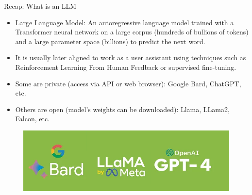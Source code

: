 \documentclass[handout]{beamer}
\begin{document}
\begin{frame}{Recap: What is an LLM}
\begin{scriptsize}
\begin{itemize}
\item  Large Language Model: An autoregressive language model trained with a Transformer neural network on a large corpus (hundreds of bullions of tokens) and a large parameter space (billions) to predict the next word.
\item It is usually later aligned to work as a user assistant using techniques such as Reinforcement Learning From Human Feedback  \cite{ouyang2022training} or supervised fine-tuning.
\item Some are private (access via API or web browser): Google Bard, ChatGPT, etc.
\item Others are open (model's weights can be downloaded): Llama, LLama2, Falcon, etc.
\end{itemize}

 \begin{figure}[h]
        	\includegraphics[scale = 0.4]{pics/gptllama.png}
        \end{figure}

\end{scriptsize}
\end{frame}
\end{document}

